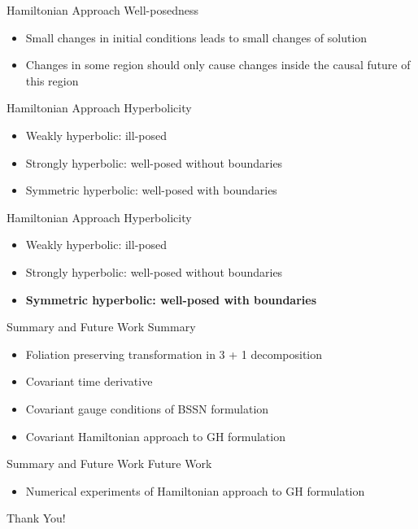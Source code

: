 \documentclass[xcolor=dvipsnames]{beamer}
\begin{document}
	\begin{frame}{Hamiltonian Approach}
		Well-posedness
		\begin{itemize}
			\pause
			\item{Small changes in initial conditions leads to small changes of solution}
			\pause
			\item{Changes in some region should only cause changes inside the causal future of this region}
		\end{itemize}
	\end{frame}
	\begin{frame}{Hamiltonian Approach}
		Hyperbolicity
		\begin{itemize}
			\item{Weakly hyperbolic: ill-posed}
			\item{Strongly hyperbolic: well-posed without boundaries}
			\item{Symmetric hyperbolic: well-posed with boundaries}
		\end{itemize}
	\end{frame}
	\begin{frame}{Hamiltonian Approach}
		Hyperbolicity
		\begin{itemize}
			\item{Weakly hyperbolic: ill-posed}
			\item{Strongly hyperbolic: well-posed without boundaries}
			\item{\textbf{{\color{red}Symmetric hyperbolic: well-posed with boundaries}}}
		\end{itemize}
	\end{frame}
	\begin{frame}{Summary and Future Work}
		Summary
		\begin{itemize}
			\item{Foliation preserving transformation in 3 + 1 decomposition}
			\item{Covariant time derivative}
			\item{Covariant gauge conditions of BSSN formulation}
			\item{Covariant Hamiltonian approach to GH formulation}
		\end{itemize}
	\end{frame}
	\begin{frame}{Summary and Future Work}
		Future Work
		\begin{itemize}
			\item{Numerical experiments of Hamiltonian approach to GH formulation}
		\end{itemize}
	\end{frame}
	\begin{frame}
		\Huge
		\begin{center}
			Thank You!
		\end{center}
	\end{frame}
\end{document}
